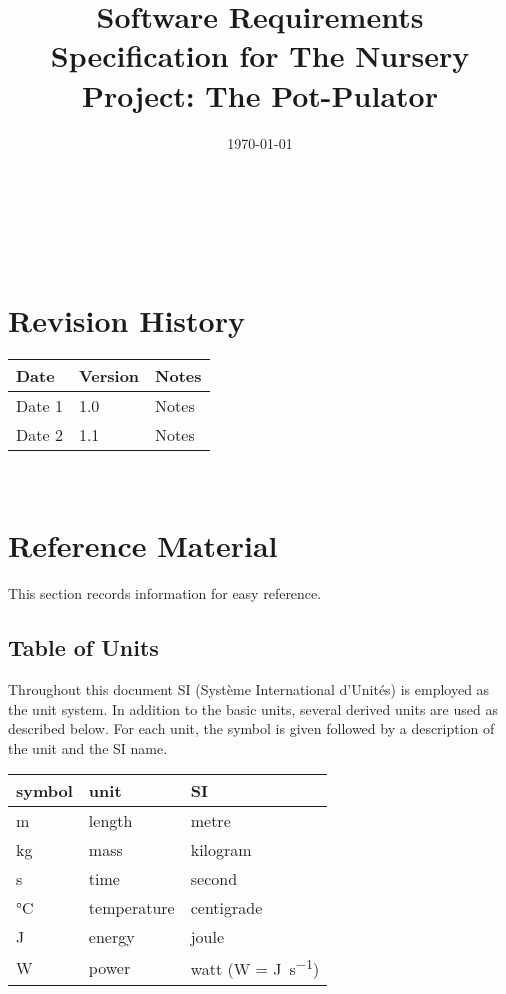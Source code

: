 \documentclass[12pt]{article}
\begin{document}
\title{Software Requirements Specification for The Nursery Project: The Pot-Pulator} 
\author{\authname}
\date{\today}
	
\maketitle

~\newpage


\tableofcontents

~\newpage

\section*{Revision History}

\begin{tabularx}{\textwidth}{p{3cm}p{2cm}X}
\toprule {\bf Date} & {\bf Version} & {\bf Notes}\\
\midrule
Date 1 & 1.0 & Notes\\
Date 2 & 1.1 & Notes\\
\bottomrule
\end{tabularx}

~\newpage

\section{Reference Material}

This section records information for easy reference.

\subsection{Table of Units}

Throughout this document SI (Syst\`{e}me International d'Unit\'{e}s) is employed
as the unit system.  In addition to the basic units, several derived units are
used as described below.  For each unit, the symbol is given followed by a
description of the unit and the SI name.
~\newline

\renewcommand{\arraystretch}{1.2}
  \noindent \begin{tabular}{l l l} 
    \toprule		
    \textbf{symbol} & \textbf{unit} & \textbf{SI}\\
    \midrule 
    \si{\metre} & length & metre\\
    \si{\kilogram} & mass	& kilogram\\
    \si{\second} & time & second\\
    \si{\celsius} & temperature & centigrade\\
    \si{\joule} & energy & joule\\
    \si{\watt} & power & watt (W = \si{\joule\per\second})\\
    \bottomrule
  \end{tabular}
\end{document}
